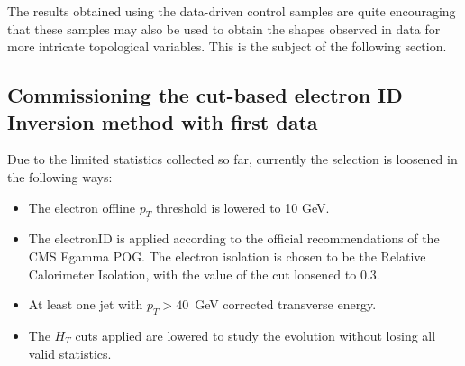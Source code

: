 The results obtained using the data-driven control samples are quite encouraging that these samples may also be used to obtain the shapes observed in data for more intricate topological variables.  This is the subject of the following section.

\subsection{Commissioning the cut-based electron ID Inversion method with first data}

Due to the limited statistics collected so far, currently the selection is loosened in the following ways:
\begin{itemize}
\item The electron offline $p_{T}$ threshold is lowered to 10 GeV.
\item The electronID is applied according to the official recommendations of the CMS Egamma POG. The electron isolation is chosen to be the Relative Calorimeter Isolation, with the value of the cut loosened to 0.3.
\item At least one jet with $p_{T} > 40$~GeV corrected transverse energy.
\item The $H_{T}$ cuts applied are lowered to study the evolution without losing all valid statistics.
\end{itemize}

